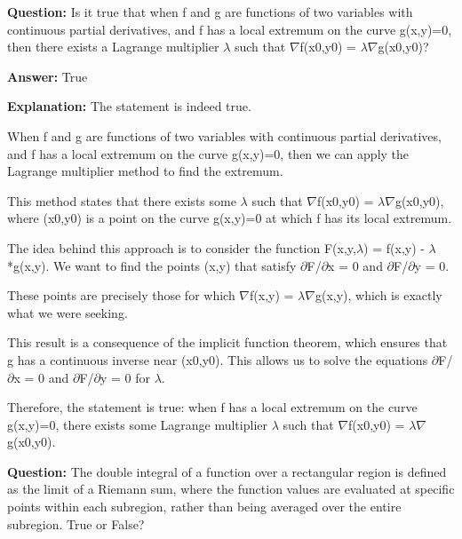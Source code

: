 \documentclass{article}
\begin{document}
                \vspace{0.5cm} 
        
            
                \textbf {Question:} Is it true that when f and g are functions of two variables with continuous partial derivatives, and f has a local extremum on the curve g(x,y)=0, then there exists a Lagrange multiplier \ensuremath{\lambda} such that \ensuremath{\nabla}f(x0,y0) = \ensuremath{\lambda}\ensuremath{\nabla}g(x0,y0)?
                
                \textbf{Answer:} True

                \textbf{Explanation:} The statement is indeed true.

When f and g are functions of two variables with continuous partial derivatives, and f has a local extremum on the curve g(x,y)=0, then we can apply the Lagrange multiplier method to find the extremum. 

This method states that there exists some \ensuremath{\lambda} such that \ensuremath{\nabla}f(x0,y0) = \ensuremath{\lambda}\ensuremath{\nabla}g(x0,y0), where (x0,y0) is a point on the curve g(x,y)=0 at which f has its local extremum.

The idea behind this approach is to consider the function F(x,y,\ensuremath{\lambda}) = f(x,y) - \ensuremath{\lambda}*g(x,y). We want to find the points (x,y) that satisfy \ensuremath{\partial}F/\ensuremath{\partial}x = 0 and \ensuremath{\partial}F/\ensuremath{\partial}y = 0. 

These points are precisely those for which \ensuremath{\nabla}f(x,y) = \ensuremath{\lambda}\ensuremath{\nabla}g(x,y), which is exactly what we were seeking.

This result is a consequence of the implicit function theorem, which ensures that g has a continuous inverse near (x0,y0). This allows us to solve the equations \ensuremath{\partial}F/\ensuremath{\partial}x = 0 and \ensuremath{\partial}F/\ensuremath{\partial}y = 0 for \ensuremath{\lambda}. 

Therefore, the statement is true: when f has a local extremum on the curve g(x,y)=0, there exists some Lagrange multiplier \ensuremath{\lambda} such that \ensuremath{\nabla}f(x0,y0) = \ensuremath{\lambda}\ensuremath{\nabla}g(x0,y0).
                
                \vspace{0.5cm} 
        
            
                \textbf {Question:} The double integral of a function over a rectangular region is defined as the limit of a Riemann sum, where the function values are evaluated at specific points within each subregion, rather than being averaged over the entire subregion. True or False?
                
\end{document}
